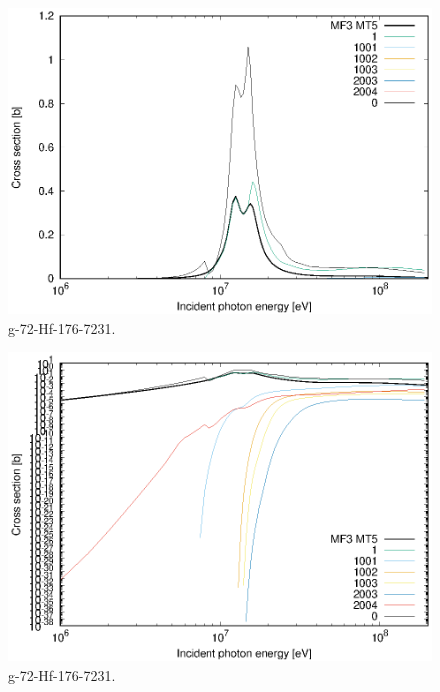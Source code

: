 \begin{figure}
 \includegraphics[width=\linewidth]{eps/g_72-Hf-176_7231.eps}
  \caption{g-72-Hf-176-7231.}
\end{figure}
\begin{figure}
 \includegraphics[width=\linewidth]{eps-log/g_72-Hf-176_7231.eps}
 \caption{g-72-Hf-176-7231.}
\end{figure}
\newpage \clearpage

